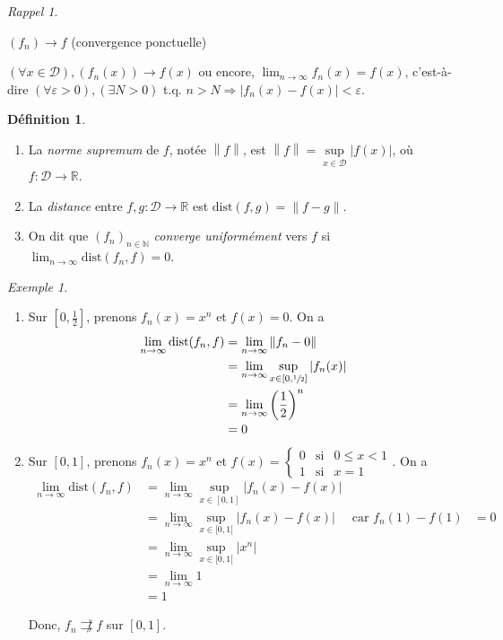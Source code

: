 \documentclass{report}
\newcommand*{\dlim}[3]{\displaystyle\lim_{#1 \to #2}#3}
\newcommand*{\norme}[1]{\left\| #1 \right\|}
\newcommand*{\abs}[1]{\left| #1 \right|}
\newcommand*{\convabs}{\rightrightarrows}
\newcommand*{\eps}{\varepsilon}
\newcommand*{\reels}{\mathbb{R}}
\newcommand*{\naturels}{\mathbb{N}}
\theoremstyle{definition}
\newtheorem*{defin}{D\'efinition}
\theoremstyle{remark}
\newtheorem*{exem}{Exemple}
\newtheorem*{rapp}{Rappel}
\begin{document}
	\begin{rapp}~

		$(f_n) \to f$ (convergence ponctuelle)

		$(\forall  x \in \mathcal{D}), (f_n(x)) \to f(x)$ ou encore, $\dlim{n}{\infty}{f_n(x)} = f(x)$, c'est-\`a-dire $(\forall\eps>0), (\exists N>0)$ t.q. $n>N \Rightarrow \abs{f_n(x) - f(x)} < \eps$.
	\end{rapp}
	\begin{defin}
		~

		\begin{enumerate}
			\item La \emph{norme supremum} de $f$, not\'ee $\norme{f}$, est $\norme{f} = \sup\limits_{x \in \mathcal{D}}\abs{f(x)}$, o\`u $f:\mathcal{D}\to\reels$.
			\item La \emph{distance} entre $f,g:\mathcal{D}\to\reels$ est $\mathrm{dist}(f,g) = \norme{f-g}$.
			\item On dit que $(f_n)_{n \in \naturels}$ \emph{converge uniform\'ement} vers $f$ si $\dlim{n}{\infty}{\mathrm{dist}(f_n,f)}=0$.
		\end{enumerate}
	\end{defin}
	\begin{exem}
		~

		\begin{enumerate}
			\item Sur $[0,\frac{1}{2}]$, prenons $f_n(x)=x^n$ et $f(x) = 0$. On a
			\begin{align*}
				\dlim{n}{\infty}{\mathrm{dist}(f_n,f)}&= \dlim{n}{\infty}{\norme{f_n-0}}\\
				&= \dlim{n}{\infty}{\sup\limits_{x \in [0,\sfrac{1}{2}]}\abs{f_n(x)}}\\
				&= \dlim{n}{\infty}{\left(\dfrac{1}{2}\right)^n}\\
				&= 0
			\end{align*}
			\item Sur $[0,1]$, prenons $f_n(x)=x^n$ et $f(x) = \left\lbrace \begin{array}{lll}
				0&\text{si}&0\leq x<1\\
				1&\text{si}&x=1
			\end{array}\right.$. On a
			\begin{align*}
				\dlim{n}{\infty}{\mathrm{dist}(f_n,f)}&= \dlim{n}{\infty}{\sup\limits_{x \in [0,1]}\abs{f_n(x)-f(x)}}\\
				&= \dlim{n}{\infty}{\sup\limits_{x \in [0,1[}\abs{f_n(x)-f(x)}}&\text{car }f_n(1)-f(1)&=0\\
				&= \dlim{n}{\infty}{\sup\limits_{x \in [0,1[}\abs{x^n}}\\
				&= \dlim{n}{\infty}{1}\\
				&= 1
			\end{align*}

			Donc, $f_n \not\convabs f$ sur $[0,1]$.
		\end{enumerate}
	\end{exem}
\end{document}
